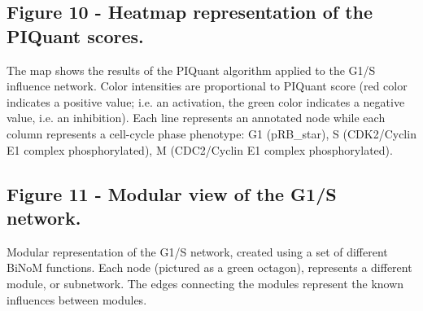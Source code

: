 \documentclass[10pt]{bmc_article}
\newenvironment{bmcformat}{\baselineskip20pt\sloppy\setboolean{publ}{false}}{\baselineskip20pt\sloppy}
\begin{document}
\begin{bmcformat}
  \subsection*{Figure 10 - Heatmap representation of the PIQuant scores.}
The map shows the results of the PIQuant algorithm applied to the G1/S
influence network. Color intensities are proportional to PIQuant score (red color indicates a positive
value; i.e. an activation, the green color indicates a negative value, i.e. an
inhibition).
Each line represents an annotated node while each column represents a cell-cycle
phase phenotype: G1 (pRB\_star), S (CDK2/Cyclin E1 complex phosphorylated), M (CDC2/Cyclin E1 complex phosphorylated).

  \subsection*{Figure 11 - Modular view of the G1/S network.}
Modular representation of the G1/S network, created using a set of
different BiNoM functions. Each node (pictured as a green octagon), represents a
different module, or subnetwork. The edges connecting the modules represent the
 known influences between modules.






\end{bmcformat}
\end{document}
